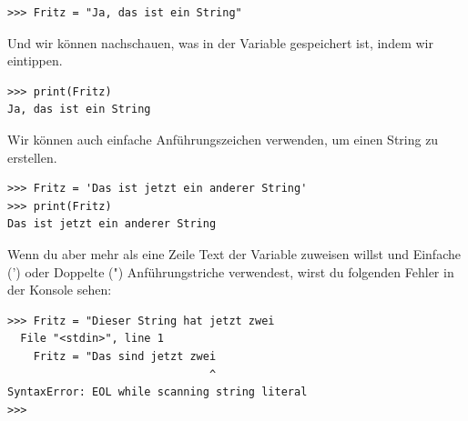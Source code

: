 \begin{Verbatim}[frame=single]
>>> Fritz = "Ja, das ist ein String"
\end{Verbatim}

\noindent
Und wir können nachschauen, was in der Variable  gespeichert ist, indem wir  eintippen.

\begin{Verbatim}[frame=single]
>>> print(Fritz)
Ja, das ist ein String
\end{Verbatim}

\noindent
Wir können auch einfache Anführungszeichen verwenden, um einen String zu erstellen.

\begin{Verbatim}[frame=single]
>>> Fritz = 'Das ist jetzt ein anderer String'
>>> print(Fritz)
Das ist jetzt ein anderer String
\end{Verbatim}

Wenn du aber mehr als eine Zeile Text der Variable zuweisen willst und Einfache (') oder Doppelte (") Anführungstriche verwendest, wirst du folgenden Fehler in der Konsole sehen:

\begin{Verbatim}[frame=single]
>>> Fritz = "Dieser String hat jetzt zwei
  File "<stdin>", line 1
    Fritz = "Das sind jetzt zwei
                               ^
SyntaxError: EOL while scanning string literal
>>>
\end{Verbatim}

